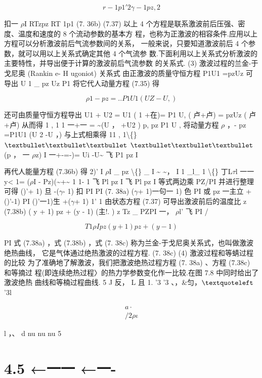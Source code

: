 \[r-1p1' 2 \gamma - 1 pz , 2\]

扣一 $\rho$I RTzpz RT 1p1 (7. 36b) (7.37) 以上 4 个方程是联系激波前后压强、密度、温度和速度的 8 个流动参数的基本方 程，也称为正激波的相容条件.应用以上方程可以分析激波前后气流参数间的关系， 一般来说，只要知道激波前后 4 个参数，就可以用以上关系式确定其他 4 个气流参 数.下面利用以上关系式分析激波的主要特性，并导出便于计算的激波前后气流参数 的关系式. (3) 激波过程的兰金-于戈尼奥 (Rankin e- H ugoniot) 关系式 由正激波的质量守恒方程 P1U1 =pzUz 可导出 U 1 \_ pz Uz P1 将它代人动量方程 (7.35) 得

\[\rho 1 - pz =.. P1 U1 (U Z - U, )\]

还可由质量守恒方程导出 U1 + U2 = U1 ( 1 +在)= P1 U, ( 卢+卢) = pzUz ( 卢+卢) 从而得 1 , 1 1 一+一 = \textasciitilde{}(U ， +U2 ) p, pz P1 U , 将动量方程 $\rho$ ，- pz =P1U1 (U 2 -U ，) 与上式相乘得 11 , 1\textbackslash\{\} ${\rm •••}$ ${\rm •••}$ (p ， 一 $\rho$z) I 一+-=-)= Ui -U\textasciitilde{} 飞 P1 pz I

再代人能量方程 (7.36b) 得 2)' I $\rho$I \_ pz \textbackslash\{\} \_ I \textasciitilde{} \textasciitilde{}， I 1 \_l\_ 1 \textbackslash\{\} 丁L$\tau$l 一一 y< 1= ($\rho$I - Pz)(\textasciitilde{}+\textasciitilde{} 1 1- 1 飞 Pl pz I 飞 Pl pz I 等式两边乘 PZ/PI 并进行整理可得 ()'+ 1) 旦 -($\gamma$- 1) 扣 PI PI (7. 38a) ($\gamma$+ 1)一句一 1) 色 PI 或 pz 一主立 +()'-1) PI ()'一1)生 +($\gamma$+ 1) 1' 1 由状态方程 (7.37) 可导出激波前后的温度比 z (7.38b) ( y + 1) pz + (y - 1) (主!. ) z Tz \_ PZPI 一， $\rho$l' 飞 PI /

\[T1 \rho  I pz (y + 1) pz + (y - 1)\]

PI 式 (7.38a) ，式 (7.38b) ，式 (7. 38c) 称为兰金-于戈尼奥关系式，也叫做激波绝热曲线， 它是气体通过绝热激波的过程方程. (7. 38c) (4) 激波过程和等蜻过程的比较 为了准确地了解激波，我们把激波绝热过程方程 (7. 38a) 、方程 (7.38c) 和等摘过 程(即连续绝热过程〉的热力学参数变化作一比较.在图 7.8 中同时给出了激波绝热 曲线和等楠过程曲线. 5 J 反， L 且 1. '3 '3 、，\&匀，${\rm ‘}$'3l

\begin{gather*}
a\cdot \\
/ 2 \rho \iota 
\end{gather*}

l ，、 d nu nu nu 5

\section*{4.5  ←一一 ←一-}

